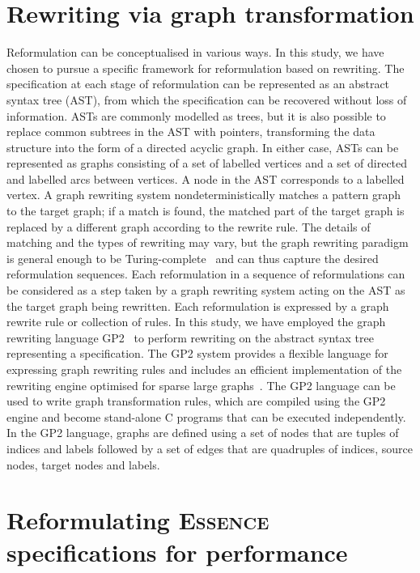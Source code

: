 \documentclass[anonymous,a4paper,UKenglish,cleveref,pdfa]{lipics-v2021}
\newcommand{\essence}{\textsc{Essence}\xspace}
\begin{document}
\section{Rewriting via graph transformation}
Reformulation can be conceptualised in various ways. In this study, we have chosen to pursue a specific framework for reformulation based on rewriting. The specification at each stage of reformulation can be represented as an abstract syntax tree (AST), from which the specification can be recovered without loss of information. ASTs are commonly modelled as trees, but it is also possible to replace common subtrees in the AST with pointers, transforming the data structure into the form of a directed acyclic graph. In either case, ASTs can be represented as graphs consisting of a set of labelled vertices and a set of directed and labelled arcs between vertices. A node in the AST corresponds to a labelled vertex. A graph rewriting system nondeterministically matches a pattern graph to the target graph; if a match is found, the matched part of the target graph is replaced by a different graph according to the rewrite rule. The details of matching and the types of rewriting may vary, but the graph rewriting paradigm is general enough to be Turing-complete~\cite{habel2001computational} and can thus capture the desired reformulation sequences. Each reformulation in a sequence of reformulations can be considered as a step taken by a graph rewriting system acting on the AST as the target graph being rewritten. Each reformulation is expressed by a graph rewrite rule or collection of rules. In this study, we have employed the graph rewriting language GP2~\cite{plump2017imperative} to perform rewriting on the abstract syntax tree representing a specification. The GP2 system provides a flexible language for expressing graph rewriting rules and includes an efficient implementation of the rewriting engine optimised for sparse large graphs~\cite{campbell2020improved}. The GP2 language can be used to write graph transformation rules, which are compiled using the GP2 engine and become stand-alone C programs that can be executed independently. In the GP2 language, graphs are defined using a set of nodes that are tuples of indices and labels followed by a set of edges that are quadruples of indices, source nodes, target nodes and labels.


\section{Reformulating \essence specifications for performance}
\end{document}
